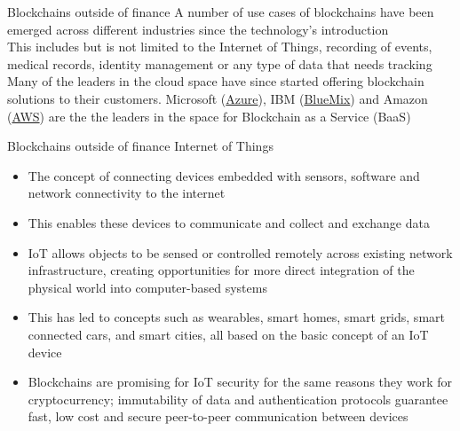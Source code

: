 \documentclass[11pt]{beamer}
\begin{document}
\begin{frame}{Blockchains outside of finance}
	A number of use cases of blockchains have been emerged across different industries since the technology's introduction \\ \vspace{3mm}
	This includes but is not limited to the Internet of Things, recording of events, medical records, identity management or any type of data that needs tracking \\ \vspace{3mm}
	Many of the leaders in the cloud space have since started offering blockchain solutions to their customers.
	Microsoft (\href{https://azure.microsoft.com/en-us/solutions/blockchain/}{Azure}), IBM (\href{https://console.bluemix.net/catalog/services/blockchain/}{BlueMix}) and Amazon (\href{https://aws.amazon.com/marketplace/}{AWS}) are the the leaders in the space for Blockchain as a Service (BaaS)
\end{frame}



\begin{frame}{Blockchains outside of finance}
	Internet of Things
	\begin{itemize}
		\item The concept of connecting devices embedded with sensors, software and network connectivity to the internet
		\item This enables these devices to communicate and collect and exchange data
		\item IoT allows objects to be sensed or controlled remotely across existing network infrastructure, creating opportunities for more direct integration of the physical world into computer-based systems
		\item This has led to concepts such as wearables, smart homes, smart grids, smart connected cars, and smart cities, all based on the basic concept of an IoT device
		\item Blockchains are promising for IoT security for the same reasons they work for cryptocurrency; immutability of data and authentication protocols guarantee fast, low cost and secure peer-to-peer communication between devices
	\end{itemize}
\end{frame}

\end{document}
